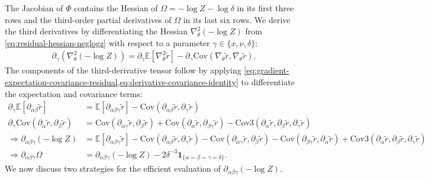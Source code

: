 \documentclass{article}
\begin{document}
The Jacobian of $\Phi$ contains the Hessian of $\Omega = -\log Z - \log\delta$ in its first three rows and the third-order partial derivatives of $\Omega$ in its last six rows.
We derive the third derivatives by differentiating the Hessian $\nabla_{\theta}^2 (-\log Z)$ from \cref{eq:residual-hessian-neglogz} with respect to a parameter $\gamma \in \{x, \nu, \delta\}$:
%
\begin{align}
  \partial_{\gamma}(\nabla_{\theta}^2 (-\log Z)) = \partial_{\gamma} \mathbb{E}[\nabla_\theta^2 \tilde{r}] - \partial_{\gamma}\mathrm{Cov}(\nabla_\theta \tilde{r}, \nabla_\theta \tilde{r}).
\end{align}
%
The components of the third-derivative tensor follow by applying \cref{eq:gradient-expectation-covariance-residual,eq:derivative-covariance-identity} to differentiate the expectation and covariance terms:
%
\begin{align}
  \partial_{\gamma} \mathbb{E}[\partial_{\alpha\beta} \tilde{r}]                         & = \mathbb{E}[\partial_{\alpha\beta\gamma} \tilde{r}] - \mathrm{Cov}(\partial_{\alpha\beta} \tilde{r}, \partial_{\gamma} \tilde{r})                                                                                                                                                                                                                                                                                                       \\
  \partial_{\gamma}\mathrm{Cov}(\partial_{\alpha} \tilde{r}, \partial_{\beta} \tilde{r}) & = \mathrm{Cov}(\partial_{\alpha\gamma} \tilde{r}, \partial_{\beta} \tilde{r}) + \mathrm{Cov}(\partial_{\alpha} \tilde{r}, \partial_{\beta\gamma} \tilde{r}) - \mathrm{Cov3}(\partial_{\alpha} \tilde{r}, \partial_{\beta} \tilde{r}, \partial_{\gamma} \tilde{r})                                                                                                                                                                        \\
  \Rightarrow \partial_{\alpha\beta\gamma} (-\log Z)                                     & = \mathbb{E}[\partial_{\alpha\beta\gamma} \tilde{r}] - \mathrm{Cov}(\partial_{\alpha\beta} \tilde{r}, \partial_{\gamma} \tilde{r}) - \mathrm{Cov}(\partial_{\alpha\gamma} \tilde{r}, \partial_{\beta} \tilde{r}) - \mathrm{Cov}(\partial_{\beta\gamma} \tilde{r}, \partial_{\alpha} \tilde{r}) + \mathrm{Cov3}(\partial_{\alpha} \tilde{r}, \partial_{\beta} \tilde{r}, \partial_{\gamma} \tilde{r}) \label{eq:neglogz-third-derivative} \\
  \Rightarrow \partial_{\alpha\beta\gamma} \Omega                                        & = \partial_{\alpha\beta\gamma} (-\log Z) - 2\delta^{-3} \mathbf{1}_{\{\alpha=\beta=\gamma=\delta\}}. \label{eq:omega-third-derivative-qrician}
\end{align}
%
We now discuss two strategies for the efficient evaluation of $\partial_{\alpha\beta\gamma}(-\log Z)$.
\end{document}
